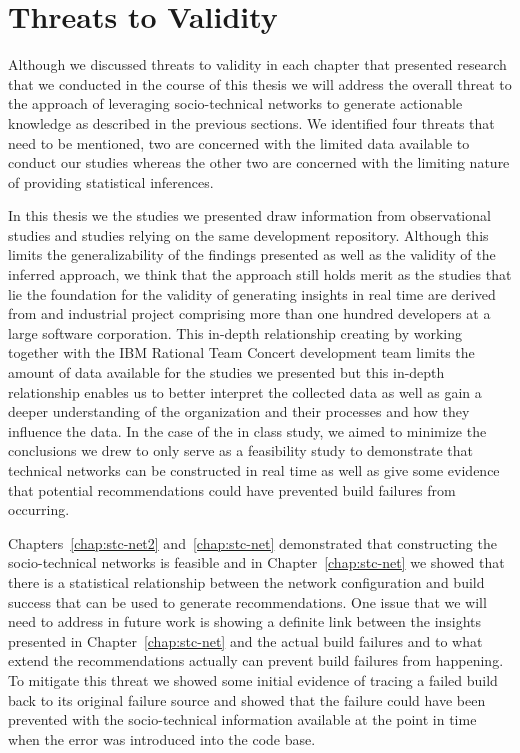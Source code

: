 \section{Threats to Validity}
Although we discussed threats to validity in each chapter that presented research that we conducted in the course of this thesis we will address the overall threat to the approach of leveraging socio-technical networks to generate actionable knowledge as described in the previous sections.
We identified four threats that need to be mentioned, two are concerned with the limited data available to conduct our studies whereas the other two are concerned with the limiting nature of providing statistical inferences.

In this thesis we the studies we presented draw information from observational studies and studies relying on the same development repository.
Although this limits the generalizability of the findings presented as well as the validity of the inferred approach, we think that the approach still holds merit as the studies that lie the foundation for the validity of generating insights in real time are derived from and industrial project comprising more than one hundred developers at a large software corporation.
This in-depth relationship creating by working together with the IBM Rational Team Concert development team limits the amount of data available for the studies we presented but this in-depth relationship enables us to better interpret the collected data as well as gain a deeper understanding of the organization and their processes and how they influence the data.
In the case of the in class study, we aimed to minimize the conclusions we drew to only serve as a feasibility study to demonstrate that technical networks can be constructed in real time as well as give some evidence that potential recommendations could have prevented build failures from occurring.

Chapters~\ref{chap:stc-net2} and~\ref{chap:stc-net} demonstrated that constructing the socio-technical networks is feasible and in Chapter~\ref{chap:stc-net} we showed that there is a statistical relationship between the network configuration and build success that can be used to generate recommendations.
One issue that we will need to address in future work is showing a definite link between the insights presented in Chapter~\ref{chap:stc-net} and the actual build failures and to what extend the recommendations actually can prevent build failures from happening.
To mitigate this threat we showed some initial evidence of tracing a failed build back to its original failure source and showed that the failure could have been prevented with the socio-technical information available at the point in time when the error was introduced into the code base.

